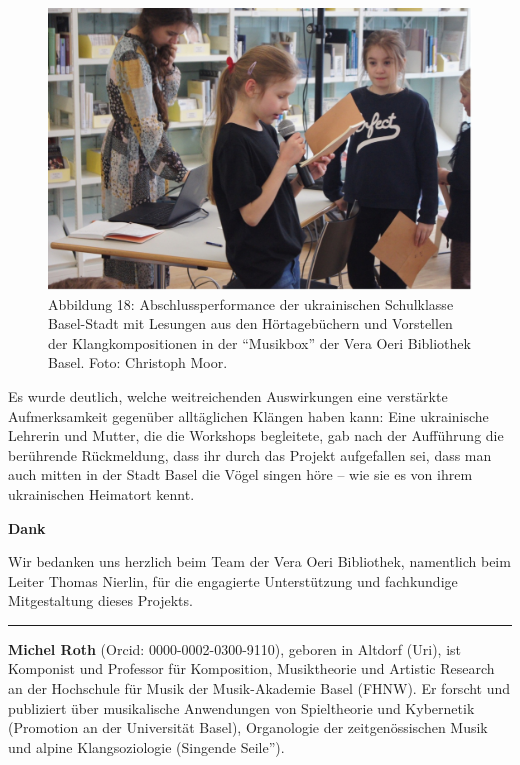 \documentclass[a4paper,
fontsize=11pt,
oneside,
numbers=noperiodatend,
parskip=half-,
bibliography=totoc,
final
]{scrartcl}
\begin{document}
\begin{figure}
\centering
\includegraphics{img/Abb18.jpg}
\caption{Abbildung 18: Abschlussperformance der ukrainischen Schulklasse Basel-Stadt
mit Lesungen aus den Hörtagebüchern und Vorstellen der
Klangkompositionen in der \enquote{Musikbox} der Vera Oeri Bibliothek
Basel. Foto: Christoph Moor.}
\end{figure}

Es wurde deutlich, welche weitreichenden Auswirkungen eine verstärkte
Aufmerksamkeit gegenüber alltäglichen Klängen haben kann: Eine
ukrainische Lehrerin und Mutter, die die Workshops begleitete, gab nach
der Aufführung die berührende Rückmeldung, dass ihr durch das Projekt
aufgefallen sei, dass man auch mitten in der Stadt Basel die Vögel
singen höre -- wie sie es von ihrem ukrainischen Heimatort kennt.

\textbf{Dank}

Wir bedanken uns herzlich beim Team der Vera Oeri Bibliothek, namentlich
beim Leiter Thomas Nierlin, für die engagierte Unterstützung und
fachkundige Mitgestaltung dieses Projekts.

\begin{center}\rule{0.5\linewidth}{0.5pt}\end{center}

\textbf{Michel Roth} (Orcid: 0000-0002-0300-9110), geboren in Altdorf
(Uri), ist Komponist und Professor für Komposition, Musiktheorie und
Artistic Research an der Hochschule für Musik der Musik-Akademie Basel
(FHNW). Er forscht und publiziert über musikalische Anwendungen von
Spieltheorie und Kybernetik (Promotion an der Universität Basel),
Organologie der zeitgenössischen Musik und alpine Klangsoziologie
(Singende Seile'').
\end{document}
